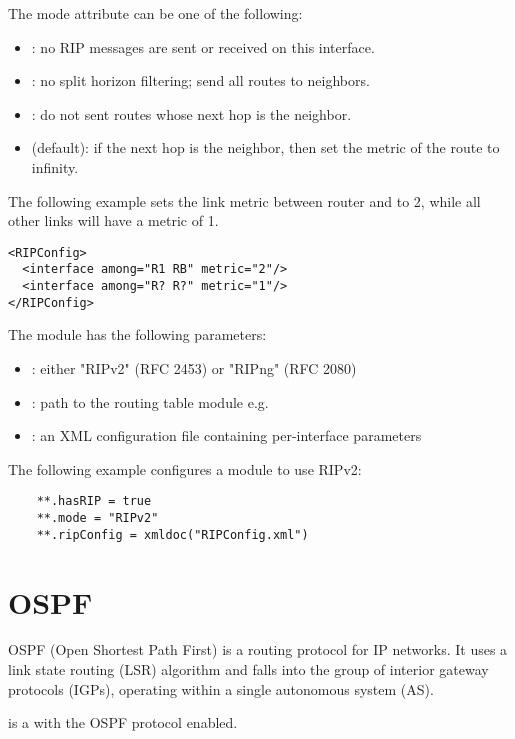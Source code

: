 The mode attribute can be one of the following:
\begin{itemize}
  \item {}: no RIP messages are sent or received on this interface.
  \item {}: no split horizon filtering; send all routes to
        neighbors.
  \item {}: do not sent routes whose next hop is the neighbor.
  \item {} (default): if the next hop is the neighbor, then
  set the metric of the route to infinity.
\end{itemize}

The following example sets the link metric between router
 and  to 2, while all other links will have a metric of 1.
\begin{verbatim}
<RIPConfig>
  <interface among="R1 RB" metric="2"/>
  <interface among="R? R?" metric="1"/>
</RIPConfig>
\end{verbatim}

The  module has the following parameters:
\begin{itemize}
  \item {}: either "RIPv2" (RFC 2453) or "RIPng" (RFC 2080)
  \item {}: path to the routing table module
        e.g. 
  \item {}: an XML configuration file containing per-interface parameters
\end{itemize}

The following example configures a  module to use RIPv2:
\begin{verbatim}
    **.hasRIP = true
    **.mode = "RIPv2"
    **.ripConfig = xmldoc("RIPConfig.xml")
\end{verbatim}

\section{OSPF}
\label{sec:ospf}

OSPF (Open Shortest Path First) is a routing protocol for IP networks.
It uses a link state routing (LSR) algorithm and falls into the group
of interior gateway protocols (IGPs), operating within a single
autonomous system (AS).

 is a  with the OSPF protocol enabled.

